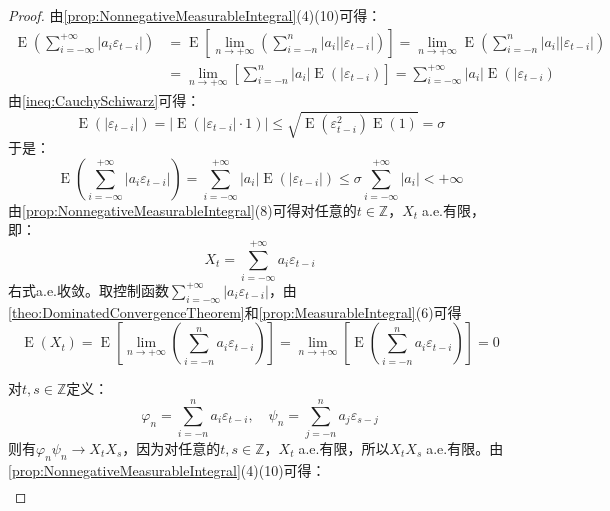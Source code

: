 \begin{proof}
	由\cref{prop:NonnegativeMeasurableIntegral}(4)(10)可得：
	\begin{align*}
		\operatorname{E}\left(\sum_{i=-\infty}^{+\infty}|a_i\varepsilon_{t-i}|\right)&=\operatorname{E}\left[\lim_{n\to+\infty}\left(\sum_{i=-n}^{n}|a_i||\varepsilon_{t-i}|\right)\right]=\lim_{n\to+\infty}\operatorname{E}\left(\sum_{i=-n}^{n}|a_i||\varepsilon_{t-i}|\right) \\
		&=\lim_{n\to+\infty}\left[\sum_{i=-n}^{n}|a_i|\operatorname{E}(|\varepsilon_{t-i})\right]=\sum_{i=-\infty}^{+\infty}|a_i|\operatorname{E}(|\varepsilon_{t-i})
	\end{align*}
	由\cref{ineq:CauchySchiwarz}可得：
	\begin{equation*}
		\operatorname{E}(|\varepsilon_{t-i}|)=\Big|\operatorname{E}(|\varepsilon_{t-i}|\cdot1)\Big|\leqslant\sqrt{\operatorname{E}(\varepsilon_{t-i}^2)\operatorname{E}(1)}=\sigma
	\end{equation*}
	于是：
	\begin{equation*}
		\operatorname{E}\left(\sum_{i=-\infty}^{+\infty}|a_i\varepsilon_{t-i}|\right)=\sum_{i=-\infty}^{+\infty}|a_i|\operatorname{E}(|\varepsilon_{t-i}|)\leqslant\sigma\sum_{i=-\infty}^{+\infty}|a_i|<+\infty
	\end{equation*}
	由\cref{prop:NonnegativeMeasurableIntegral}(8)可得对任意的$t\in\mathbb{Z}$，$X_t\;$a.e.有限，即：
	\begin{equation*}
		X_t=\sum_{i=-\infty}^{+\infty}a_i\varepsilon_{t-i}
	\end{equation*}
	右式a.e.收敛。取控制函数$\sum\limits_{i=-\infty}^{+\infty}|a_i\varepsilon_{t-i}|$，由\cref{theo:DominatedConvergenceTheorem}和\cref{prop:MeasurableIntegral}(6)可得
	\begin{equation*}
		\operatorname{E}(X_t)=\operatorname{E}\left[\lim_{n\to+\infty}\left(\sum_{i=-n}^{n}a_i\varepsilon_{t-i}\right)\right]=\lim_{n\to+\infty}\left[\operatorname{E}\left(\sum_{i=-n}^{n}a_i\varepsilon_{t-i}\right)\right]=0
	\end{equation*}\par
	对$t,s\in\mathbb{Z}$定义：
	\begin{equation*}
		\varphi_n=\sum_{i=-n}^{n}a_i\varepsilon_{t-i},\quad\psi_n=\sum_{j=-n}^{n}a_j\varepsilon_{s-j}
	\end{equation*}
	则有$\varphi_n\psi_n\to X_tX_s$，因为对任意的$t,s\in\mathbb{Z}$，$X_t\;$a.e.有限，所以$X_tX_s\;$a.e.有限。由\cref{prop:NonnegativeMeasurableIntegral}(4)(10)可得：
	\begin{align*}

\end{align*}
\end{proof}
